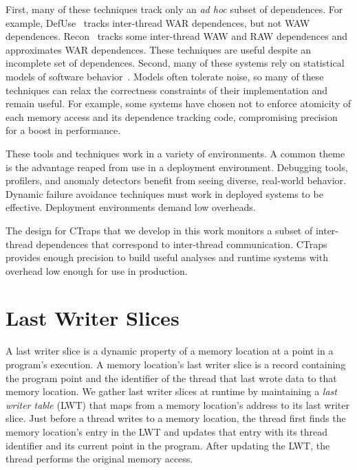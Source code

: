 \documentclass[preprint,9pt]{sigplanconf}
\newcommand{\ctraps}{CTraps\xspace}
\newcommand{\lwt}{LWT\xspace}
\begin{document}
First, many of these techniques track only an {\em ad hoc} subset of
dependences.  For example, DefUse~\cite{defuse} tracks inter-thread WAR
dependences, but not WAW dependences.  Recon~\cite{recon} tracks some inter-thread WAW and
RAW dependences and approximates WAR dependences.  These techniques are useful
despite an incomplete set of dependences.  Second, many of these systems rely
on statistical models of software
behavior~\cite{avio,cci,defuse,recon,bugaboo,falcon,dmtracker,aviso,threadcriticality,schedpredictionmodel}.
Models often tolerate noise, so many of these techniques can relax the
correctness constraints of their implementation and remain useful.  For
example, some systems have chosen not to enforce atomicity of each memory
access and its dependence tracking code, compromising precision for a boost in
performance.

These tools and techniques work in a variety of environments.  A common theme
is the advantage reaped from use in a deployment environment.  Debugging tools,
profilers, and anomaly detectors benefit from seeing diverse, real-world
behavior.  Dynamic failure avoidance techniques must work in deployed systems
to be effective.  Deployment environments demand low overheads.  

The design for \ctraps that we develop in this work monitors a subset of
inter-thread dependences that correspond to inter-thread communication.
\ctraps provides enough precision to build useful analyses and runtime systems
with overhead low enough for use in production.



\section{Last Writer Slices}
\label{sec:lastwriterslices}
A last writer slice is a dynamic property of a memory location at a point in a
program's execution.   A memory location's last writer slice is a record
containing the program point and the identifier of the thread that last wrote
data to that memory location.  We gather last writer slices at runtime by
maintaining a {\em last writer table} (\lwt) that maps from a memory
location's address to its last writer slice.  Just before a thread writes to a
memory location,  the thread first finds the memory location's entry in the
\lwt and updates that entry with its thread identifier and its current point in the
program.  After updating the \lwt, the thread performs the original memory
access.
\end{document}
